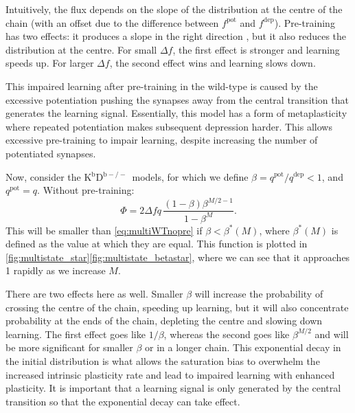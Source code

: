 \documentclass[10pt]{article}
\newcommand{\pot}{^{\text{pot}}}
\newcommand{\dep}{^{\text{dep}}}
\newcommand{\KO}{K$^\mathrm{b}$D$^{\mathrm{b}-/-}$}
\begin{document}
Intuitively, the flux depends on the slope of the distribution at the centre of the chain (with an offset due to the difference between $f\pot$ and $f\dep$).
Pre-training has two effects: it produces a slope in the right direction
, but it also reduces the distribution at the centre.
For small $\Delta f$, the first effect is stronger and learning speeds up.
For larger $\Delta f$, the second effect wins and learning slows down.

This impaired learning after pre-training in the wild-type is caused by the excessive potentiation pushing the synapses away from the central transition that generates the learning signal.
Essentially, this model has a form of metaplasticity where repeated potentiation makes subsequent depression harder.
This allows excessive pre-training to impair learning, despite increasing the number of potentiated synapses.


Now, consider the \KO\ models, for which we define $\beta=q\pot/q\dep<1$, and $q\pot=q$.
Without pre-training:
%
\begin{equation}\label{eq:multiKOnopre}
  \Phi = 2{\Delta f} q\,\frac{(1-\beta)\beta^{M/2-1}}{1-\beta^M}.
\end{equation}
%
This will be smaller than \eqref{eq:multiWTnopre} if $\beta<\beta^*(M)$, where $\beta^*(M)$ is defined as the value at which they are equal.
This function is plotted in \autoref{fig:multistate_star}\ref{fig:multistate_betastar}, where we can see that it approaches 1 rapidly as we increase $M$.

There are two effects here as well.
Smaller $\beta$ will increase the probability of crossing the centre of the chain, speeding up learning, but it will also concentrate probability at the ends of the chain, depleting the centre and slowing down learning.
The first effect goes like $1/\beta$, whereas the second goes like $\beta^{M/2}$ and will be more significant for smaller $\beta$ or in a longer chain.
This exponential decay in the initial distribution is what allows the saturation bias to overwhelm the increased intrinsic plasticity rate and lead to impaired learning with enhanced plasticity.
It is important that a learning signal is only generated by the central transition so that the exponential decay can take effect.
\end{document}
